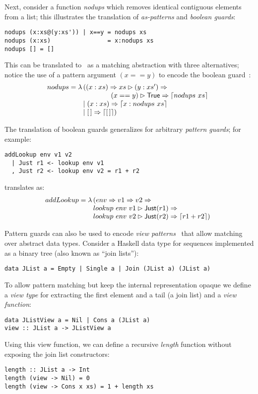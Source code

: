 Next, consider a function \emph{nodups} which removes identical contiguous elements
from a list; this illustrates the translation of 
\emph{as-patterns} and \emph{boolean guards}:
%
\begin{verbatim}
nodups (x:xs@(y:xs')) | x==y = nodups xs
nodups (x:xs)                = x:nodups xs
nodups [] = []
\end{verbatim}
%
This can be translated to \lambdaPMC\
as a matching abstraction with three alternatives;
notice the use of a pattern argument $(x==y)$ to encode the
boolean guard~\cite{kahl_2004}:
\[
  nodups = \lambda
  \!\!\begin{array}[t]{l}
    ((x:xs) \Rightarrow
    xs \rhd (y:xs') \Rightarrow \\
     \qquad\qquad (x==y) \rhd \textsf{True} \Rightarrow \left\lceil nodups~ xs\right\rceil  \\
    \mid (x:xs) \Rightarrow  \left\lceil x: nodups~xs\right\rceil \\
    \mid [\,] \Rightarrow \left\lceil [\,]\right\rceil)
  \end{array}
\]

The translation of boolean guards generalizes
for arbitrary \emph{pattern guards}; for example:
\begin{verbatim}
addLookup env v1 v2 
  | Just r1 <- lookup env v1
  , Just r2 <- lookup env v2 = r1 + r2
\end{verbatim}
%
translates as:
\[
  addLookup = \lambda \!\!\begin{array}[t]{l}
                     (env \Rightarrow v1 \Rightarrow v2 \Rightarrow \\
                     lookup~ env~ v1 \rhd \textsf{Just}(r1) \Rightarrow \\
                     lookup~ env~ v2 \rhd \textsf{Just}(r2) \Rightarrow  \left\lceil r1 + r2\right\rceil)
                     \end{array}
\]



  Pattern guards can also be used to encode
  \emph{view patterns}~\cite{wadler_1987,ghc_guide_view_patterns}
  that allow matching over abstract data types.
  Consider a Haskell data type for sequences implemented as a binary tree
  (also known as ``join lists''):
\begin{verbatim}
data JList a = Empty | Single a | Join (JList a) (JList a)
\end{verbatim}
  To allow pattern matching but keep the internal representation opaque
  we define a \emph{view type} for extracting
  the first element and a tail (a join list) and a \emph{view function}:
\begin{verbatim}
data JListView a = Nil | Cons a (JList a)
view :: JList a -> JListView a
\end{verbatim}
  Using this view function, we can define a recursive \textit{length} function
  without exposing the join list constructors:
\begin{verbatim}
length :: JList a -> Int
length (view -> Nil) = 0
length (view -> Cons x xs) = 1 + length xs
\end{verbatim}


